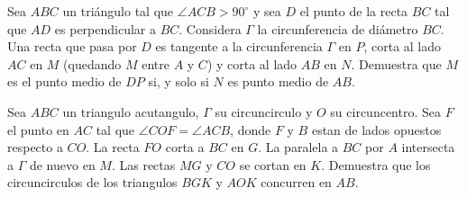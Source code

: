 \documentclass[11pt]{scrartcl}
\begin{document}
\begin{problem}
[2021/2] Sea $ABC$ un triángulo tal que $\angle ACB > 90^{\circ}$ y sea $D$ el punto de la recta $BC$ tal que $AD$ es perpendicular a $BC$. Considera $\Gamma$ la circunferencia de diámetro $BC$. Una recta que pasa por $D$ es tangente a la circunferencia $\Gamma$ en $P$, corta al lado $AC$ en $M$ (quedando $M$ entre $A$ y $C$) y corta al lado $AB$ en $N$.
Demuestra que $M$ es el punto medio de $DP$ si, y solo si $N$ es punto medio de $AB$.
\end{problem}
\begin{problem} [2023/5]
    Sea $ABC$ un triangulo acutangulo, $\Gamma$ su circuncirculo y $O$ su circuncentro. Sea $F$ el punto en $AC$ tal que $\angle COF=\angle ACB$, donde $F$ y $B$ estan de lados opuestos respecto a $CO$. La recta $FO$ corta a $BC$ en $G$. La paralela a $BC$ por $A$ intersecta a $\Gamma$ de nuevo en $M$. Las rectas $MG$ y $CO$ se cortan en $K$. Demuestra que los circuncirculos de los triangulos $BGK$ y $AOK$ concurren en $AB$.
\end{problem}
\end{document}
